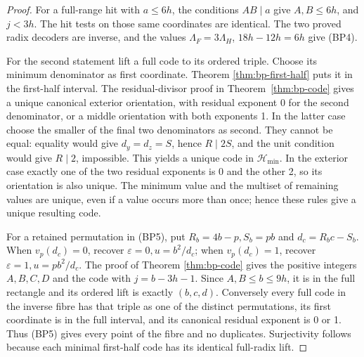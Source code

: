 \begin{proof}
For a full-range hit with \(a\le6h\), the conditions \(AB\mid a\)
give \(A,B\le6h\), and \(j<3h\). The hit tests on those same
coordinates are identical. The two proved radix decoders are inverse,
and the values \(\Lambda_F=3\Lambda_H\), \(18h-12h=6h\)
give (BP4).

For the second statement lift a full code to its ordered triple.
Choose its minimum denominator as first coordinate. Theorem
\ref{thm:bp-first-half} puts it in the first-half interval. The
residual-divisor proof in Theorem~\ref{thm:bp-code} gives a unique
canonical exterior orientation, with residual exponent 0 for the
second denominator, or a middle orientation with both exponents 1.
In the latter case choose the smaller of the final two denominators
as second. They cannot be equal: equality would give
\(d_y=d_z=S\), hence \(R\mid2S\), and the unit condition would
give \(R\mid2\), impossible. This yields a unique code in
\(\mathcal H_{\min}\). In the exterior case exactly one of the
two residual exponents is 0 and the other 2, so its orientation is
also unique. The minimum value and the multiset of remaining values
are unique, even if a value occurs more than once; hence these rules
give a unique resulting code.

For a retained permutation in (BP5), put \(R_b=4b-p,S_b=pb\) and
\(d_c=R_bc-S_b\). When \(v_p(d_c)=0\), recover
\(\varepsilon=0,u=b^2/d_c\); when \(v_p(d_c)=1\), recover
\(\varepsilon=1,u=pb^2/d_c\). The proof of Theorem
\ref{thm:bp-code} gives the positive integers \(A,B,C,D\) and
the code with \(j=b-3h-1\). Since \(A,B\le b\le9h\), it is
in the full rectangle and its ordered lift is exactly \((b,c,d)\).
Conversely every full code in the inverse fibre has that triple as
one of the distinct permutations, its first coordinate is in the
full interval, and its canonical residual exponent is 0 or 1.
Thus (BP5) gives every point of the fibre and no duplicates.
Surjectivity follows because each minimal first-half code has its
identical full-radix lift.
\end{proof}


